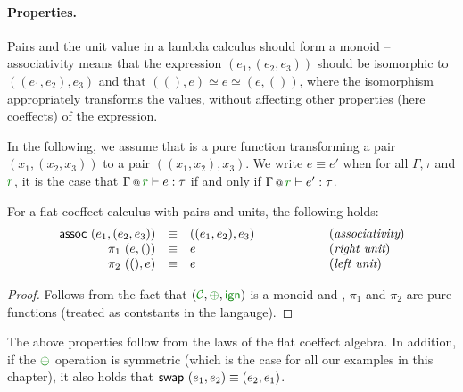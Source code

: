 \paragraph{Properties.}
Pairs and the unit value in a lambda calculus should form a monoid -- associativity means that 
the expression $(e_1, (e_2, e_3))$ should be isomorphic to $((e_1, e_2), e_3)$ and that
$((), e) \simeq e \simeq (e, ())$, where the isomorphism appropriately transforms the values,
without affecting other properties (here coeffects) of the expression. 

In the following, we assume that  is a pure function transforming a pair $(x_1, (x_2, x_3))$ 
to a pair $((x_1, x_2), x_3)$. We write $e \equiv e'$ when for all $\Gamma, \tau$ and $\cclrd{r}$,
it is the case that $\coctx{\Gamma}{\cclrd{r}} \vdash e : \tau$ if and only if
$\coctx{\Gamma}{\cclrd{r}} \vdash e' : \tau$.

\begin{theorem}
For a flat coeffect calculus with pairs and units, the following holds:
%
\begin{equation*}
\begin{array}{rclcl}
 \textnormal{\sffamily assoc}~(e_1, (e_2, e_3)) &\equiv& ((e_1, e_2), e_3) &\qquad\qquad&(\emph{associativity}) \\
 \pi_1~(e, ()) &\equiv& e &&(\emph{right unit})\\
 \pi_2~((), e) &\equiv& e &&(\emph{left unit})\\
\end{array} 
\end{equation*}
\end{theorem}
\begin{proof}
Follows from the fact that $(\C, \cpar, \czero)$ is a monoid and , $\pi_1$ and
$\pi_2$ are pure functions (treated as contstants in the langauge).
\end{proof}

The above properties follow from the laws of the flat coeffect algebra. In addition, if the 
$\cpar$ operation is symmetric (which is the case for all our examples in this chapter), it 
also holds that $\textnormal{\sffamily swap}~(e_1, e_2) \equiv (e_2, e_1)$.




%                                                 
%

